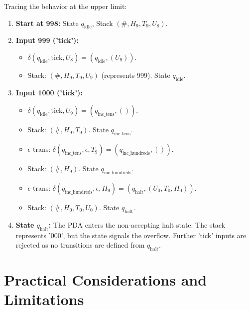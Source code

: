 \documentclass[11pt]{article}
\begin{document}
Tracing the behavior at the upper limit:
\begin{enumerate}
    \item \textbf{Start at 998:} State $q_{\text{idle}}$, Stack $(\#, H_9, T_9, U_8)$.
    \item \textbf{Input 999 ('tick'):}
        \begin{itemize}
            \item $\delta(q_{\text{idle}}, \text{tick}, U_8) = (q_{\text{idle}}, (U_9))$.
            \item Stack: $(\#, H_9, T_9, U_9)$ (represents 999). State $q_{\text{idle}}$.
        \end{itemize}
    \item \textbf{Input 1000 ('tick'):}
        \begin{itemize}
            \item $\delta(q_{\text{idle}}, \text{tick}, U_9) = (q_{\text{inc\_tens}}, ())$.
            \item Stack: $(\#, H_9, T_9)$. State $q_{\text{inc\_tens}}$.
            \item $\epsilon$-trans: $\delta(q_{\text{inc\_tens}}, \epsilon, T_9) = (q_{\text{inc\_hundreds}}, ())$.
            \item Stack: $(\#, H_9)$. State $q_{\text{inc\_hundreds}}$.
            \item $\epsilon$-trans: $\delta(q_{\text{inc\_hundreds}}, \epsilon, H_9) = (q_{\text{halt}}, (U_0, T_0, H_0))$.
            \item Stack: $(\#, H_0, T_0, U_0)$. State $q_{\text{halt}}$.
        \end{itemize}
    \item \textbf{State $q_{\text{halt}}$:} The PDA enters the non-accepting halt state. The stack represents '000', but the state signals the overflow. Further 'tick' inputs are rejected as no transitions are defined from $q_{\text{halt}}$.
\end{enumerate}

\section{Practical Considerations and Limitations} \label{sec:practical_considerations_3digit}
\end{document}

